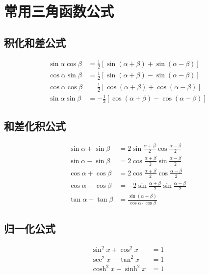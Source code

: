 \documentclass[10pt,a4paper]{article}
\begin{document}
\allowdisplaybreaks%
\maketitle
\thispagestyle{empty}
\newpage
\tableofcontents
\thispagestyle{empty}
\newpage
\setcounter{page}{1}
\section{常用三角函数公式}
\subsection{积化和差公式}
\begin{align}
    \sin \alpha \cos \beta & =\frac{1}{2}[\sin (\alpha+\beta)+\sin(\alpha-\beta)]  \\[7pt]
    \cos \alpha \sin \beta & =\frac{1}{2}[\sin (\alpha+\beta)-\sin(\alpha-\beta)]  \\[7pt]
    \cos \alpha \cos \beta & =\frac{1}{2}[\cos (\alpha+\beta)+\cos(\alpha-\beta)]  \\[7pt]
    \sin \alpha \sin \beta & =-\frac{1}{2}[\cos (\alpha+\beta)-\cos(\alpha-\beta)]
\end{align}
\subsection{和差化积公式}
\begin{align}
    \sin\alpha+\sin\beta & =2\sin\frac{\alpha+\beta}{2}\cos\frac{\alpha-\beta}{2}  \\[7pt]
    \sin\alpha-\sin\beta & =2\cos\frac{\alpha+\beta}{2}\sin\frac{\alpha-\beta}{2}  \\[7pt]
    \cos\alpha+\cos\beta & =2\cos\frac{\alpha+\beta}{2}\cos\frac{\alpha-\beta}{2}  \\[7pt]
    \cos\alpha-\cos\beta & =-2\sin\frac{\alpha+\beta}{2}\sin\frac{\alpha-\beta}{2} \\[7pt]
    \tan\alpha+\tan\beta & =\frac{\sin (\alpha+\beta)}{\cos\alpha\cdot\cos \beta}
\end{align}
\subsection{归一化公式}
\begin{align}\label{gyhgs}
    \sin^2 x+\cos^2x  & =1 \\[7pt]
    \sec^2 x-\tan^2x  & =1 \\[7pt]
    \cosh^2x-\sinh^2x & =1
\end{align}
\end{document}
